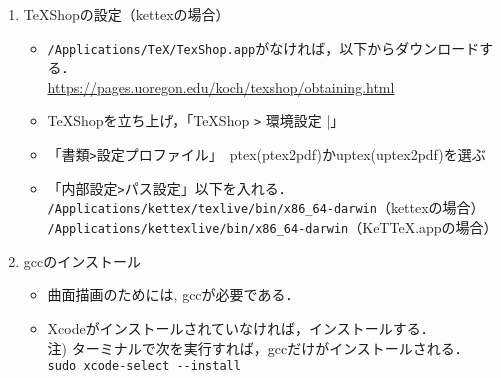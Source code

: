 \documentclass{ujarticle}
\begin{document}
\begin{enumerate}[\bf\large 1.]
\item TeXShopの設定（kettexの場合）
  \begin{itemize}
  \item \verb|/Applications/TeX/TexShop.app|がなければ，以下からダウンロードする．\\
  \hspace*{5mm}\url{https://pages.uoregon.edu/koch/texshop/obtaining.html}
  \item TeXShopを立ち上げ，「TeXShop \verb|>| 環境設定 |」
  \item 「書類\verb|>|設定プロファイル」　ptex(ptex2pdf)かuptex(uptex2pdf)を選ぶ
  \item 「内部設定\verb|>|パス設定」以下を入れる．\\
  \hspace*{10mm}\verb|/Applications/kettex/texlive/bin/x86_64-darwin|（kettexの場合）\\
  \hspace*{10mm}\verb|/Applications/kettexlive/bin/x86_64-darwin|（KeTTeX.appの場合）
  \end{itemize}

\item gccのインストール
  \begin{itemize}
    \item 曲面描画のためには, gccが必要である．
    \item Xcodeがインストールされていなければ，インストールする．\\
    \hspace*{5mm}注) ターミナルで次を実行すれば，gccだけがインストールされる．\\
    \hspace*{20mm}\verb|sudo xcode-select --install|
  \end{itemize}


\end{enumerate}
\end{document}
